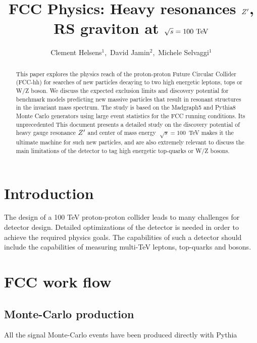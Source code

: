 \documentclass{cernrep}
\begin{document}
\title{FCC Physics: Heavy resonances $Z^{\prime}$, RS graviton at $\sqrt{s} = 100 \TeV$}
\author{Clement Helsens${}^1$,\,
David Jamin${}^2$,\,
Michele Selvaggi${}^1$}


\begin{abstract}
This paper explores the physics reach of the proton-proton Future Circular Collider (FCC-hh)
for searches of new particles decaying to two high energetic leptons, tops or W/Z boson. We discuss the expected exclusion limits and discovery potential for benchmark models 
predicting new massive particles that result in resonant structures in
the invariant mass spectrum. The study is based on the Madgraph5 and Pythia8 Monte Carlo generators using large event statistics for the FCC running conditions. 
Its unprecedented  
This document presents a detailed study on the discovery potential of heavy gauge resonance $Z^{\prime}$ and center of mass energy $\sqrt[]{s} =100$~TeV makes it the ultimate machine for such new particles, and are also extremely relevant to discuss the main limitations of the detector to tag high energetic top-quarks or W/Z bosons.
\end{abstract}
\maketitle
\tableofcontents

\section{Introduction}
The design of a 100 TeV proton-proton collider leads to many challenges for detector design. Detailed optimizations of the detector is needed in order to achieve the required physics goals. The capabilities of such a detector should include the capabilities of measuring multi-TeV leptons, top-quarks and bosons.

\section{FCC work flow}
\subsection{Monte-Carlo production}
All the signal Monte-Carlo events have been produced directly with Pythia 
\end{document}
